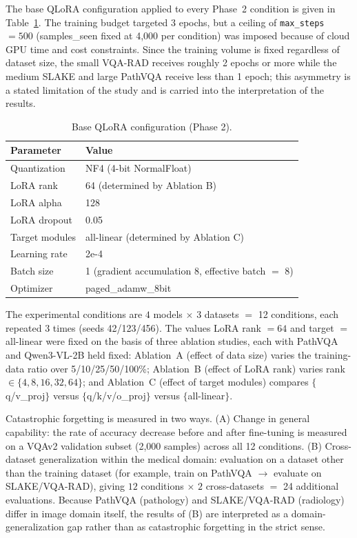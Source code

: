 The base QLoRA configuration applied to every Phase~2 condition is given in
Table~\ref{tab:qlora}. The training budget targeted 3 epochs, but a ceiling of
\texttt{max\_steps}~$=500$ (samples\_seen fixed at 4,000 per condition) was
imposed because of cloud GPU time and cost constraints. Since the training volume
is fixed regardless of dataset size, the small VQA-RAD receives roughly 2 epochs
or more while the medium SLAKE and large PathVQA receive less than 1 epoch; this
asymmetry is a stated limitation of the study and is carried into the
interpretation of the results.

\begin{table}[t]
\centering
\caption{Base QLoRA configuration (Phase 2).}
\label{tab:qlora}
\small
\begin{tabular}{@{}ll@{}}
\toprule
Parameter & Value \\
\midrule
Quantization    & NF4 (4-bit NormalFloat) \\
LoRA rank       & 64 (determined by Ablation B) \\
LoRA alpha      & 128 \\
LoRA dropout    & 0.05 \\
Target modules  & all-linear (determined by Ablation C) \\
Learning rate   & 2e-4 \\
Batch size      & 1 (gradient accumulation 8, effective batch $=$ 8) \\
Optimizer       & paged\_adamw\_8bit \\
\bottomrule
\end{tabular}
\end{table}

The experimental conditions are $4$ models $\times$ $3$ datasets $=$ 12
conditions, each repeated 3 times (seeds 42/123/456). The values LoRA rank $=64$
and target $=$ all-linear were fixed on the basis of three ablation studies, each
with PathVQA and Qwen3-VL-2B held fixed: Ablation~A (effect of data size) varies
the training-data ratio over 5/10/25/50/100\%; Ablation~B (effect of LoRA rank)
varies rank $\in \{4, 8, 16, 32, 64\}$; and Ablation~C (effect of target modules)
compares $\{$q/v\_proj$\}$ versus $\{$q/k/v/o\_proj$\}$ versus
$\{$all-linear$\}$.

Catastrophic forgetting is measured in two ways. (A) Change in general
capability: the rate of accuracy decrease before and after fine-tuning is
measured on a VQAv2 validation subset (2,000 samples) across all 12 conditions.
(B) Cross-dataset generalization within the medical domain: evaluation on a
dataset other than the training dataset (for example, train on PathVQA $\to$
evaluate on SLAKE/VQA-RAD), giving $12$ conditions $\times$ $2$ cross-datasets
$=$ 24 additional evaluations. Because PathVQA (pathology) and SLAKE/VQA-RAD
(radiology) differ in image domain itself, the results of (B) are interpreted as
a domain-generalization gap rather than as catastrophic forgetting in the strict
sense.

